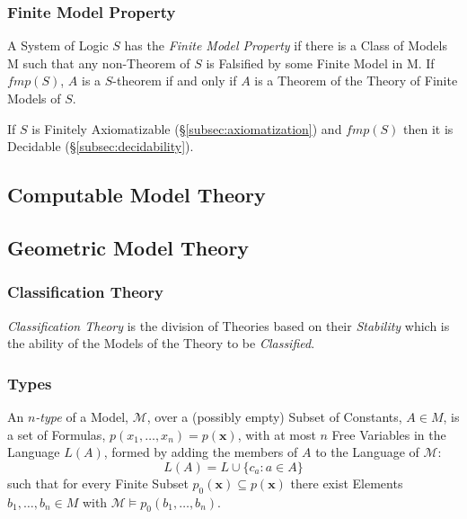 \documentclass{article}
\begin{document}
\subsubsection{Finite Model Property}

A System of Logic $S$ has the \emph{Finite Model Property} if there is
a Class of Models $\mathrm{M}$ such that any non-Theorem of $S$ is
Falsified by some Finite Model in $\mathrm{M}$. If $fmp(S)$, $A$ is a
$S$-theorem if and only if $A$ is a Theorem of the Theory of Finite
Models of $S$.

If $S$ is Finitely Axiomatizable (\S\ref{subsec:axiomatization}) and
$fmp(S)$ then it is Decidable (\S\ref{subsec:decidability}).

\subsection{Computable Model Theory}\label{subsec:computable_model_theory}

\cite{harizanov98}

\subsection{Geometric Model Theory}

\subsubsection{Classification Theory}

\emph{Classification Theory} is the division of Theories based on
their \emph{Stability} which is the ability of the Models of the
Theory to be \emph{Classified}.

\subsubsection{Types}

An \emph{$n$-type} of a Model, $\mathcal{M}$, over a (possibly empty)
Subset of Constants, $A \in M$, is a set of Formulas,
$p(x_1,\ldots,x_n) = p(\mathbf{x})$, with at most $n$ Free Variables
in the Language $L(A)$, formed by adding the members of $A$ to the
Language of $\mathcal{M}$:
\[
    L(A) = L \cup \{ c_a : a \in A \}
\]
such that for every Finite Subset $p_0(\mathbf{x}) \subseteq
p(\mathbf{x})$ there exist Elements $b_1,\ldots,b_n \in M$ with
$\mathcal{M} \vDash p_0(b_1,\ldots,b_n)$.
\end{document}
